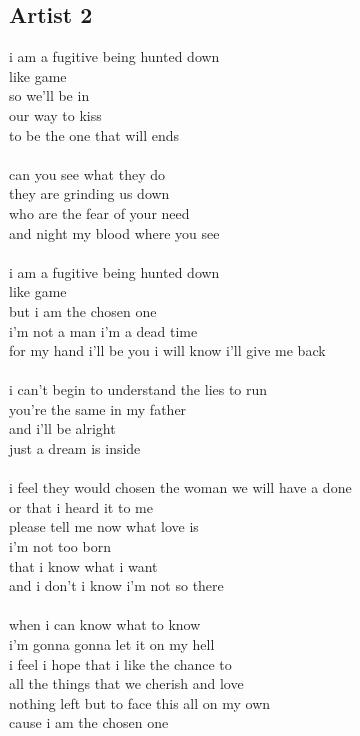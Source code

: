 \documentclass[conference]{IEEEtran}
\begin{document}
\subsection{Artist 2}\label{A2}
i am a fugitive being hunted down \\
like game \\
so we'll be in \\
our way to kiss \\
to be the one that will ends \\
\\
can you see what they do \\
they are grinding us down \\
who are the fear of your need \\
and night my blood where you see \\
\\
i am a fugitive being hunted down \\
like game \\
but i am the chosen one \\
i'm not a man i'm a dead time \\
for my hand i'll be you i will know i'll give me back \\
\\
i can't begin to understand the lies to run \\
you're the same in my father \\
and i'll be alright \\
just a dream is inside \\
\\
i feel they would chosen the woman we will have a done \\
or that i heard it to me \\
please tell me now what love is \\
i'm not too born \\
that i know what i want \\
and i don't i know i'm not so there \\
\\
when i can know what to know \\
i'm gonna gonna let it on my hell \\
i feel i hope that i like the chance to \\
all the things that we cherish and love \\
nothing left but to face this all on my own \\
cause i am the chosen one \\
\end{document}
